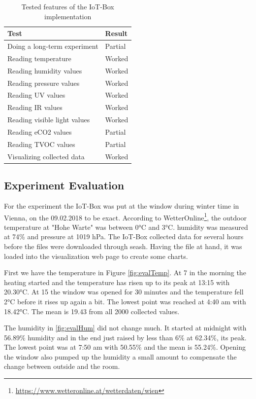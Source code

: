 \documentclass[bachelorthesis, grey, english]{mas-thesis-chapters} %
\begin{document}
\begin{table}[H]
\centering
\begin{tabular}{|l|l|}
\hline
\textbf{Test} & \textbf{Result} \\ \hline
Doing a long-term experiment & Partial \\ \hline
Reading temperature & Worked \\ \hline
Reading humidity values & Worked \\ \hline
Reading pressure values & Worked \\ \hline
Reading \gls{UV} values & Worked \\ \hline
Reading \gls{IR} values & Worked \\ \hline
Reading visible light values & Worked \\ \hline
Reading \gls{eCO2} values & Partial \\ \hline
Reading \gls{TVOC} values & Partial \\ \hline
Visualizing collected data & Worked \\ \hline
\end{tabular}
\caption{Tested features of the \gls{IoT}-Box implementation}
\label{tab:funcTest}
\end{table}

\subsection{Experiment Evaluation}

For the experiment the \gls{IoT}-Box was put at the window during winter time in Vienna, on the 09.02.2018 to be exact. According to WetterOnline\footnote{\url{https://www.wetteronline.at/wetterdaten/wien}}, the outdoor temperature at "Hohe Warte" was between 0°\gls{C} and 3°\gls{C}. humidity was measured at 74\% and pressure at 1019 \gls{hPa}. The \gls{IoT}-Box collected data for several hours before the files were downloaded through \gls{seash}. Having the file at hand, it was loaded into the visualization web page to create some charts.
\newpage

First we have the temperature in Figure \ref{fig:evalTemp}. At 7 in the morning the heating started and the temperature has risen up to its peak at 13:15 with 20.30°\gls{C}. At 15 the window was opened for 30 minutes and the temperature fell 2°\gls{C} before it rises up again a bit. The lowest point was reached at 4:40 am with 18.42°\gls{C}. The mean is 19.43 from all 2000 collected values.

The humidity in \ref{fig:evalHum} did not change much. It started at midnight with 56.89\% humidity and in the end just raised by less than 6\% at 62.34\%, its peak. The lowest point was at 7:50 am with 50.55\% and the mean is 55.24\%. Opening the window also pumped up the humidity a small amount to compensate the change between outside and the room.
\end{document}
